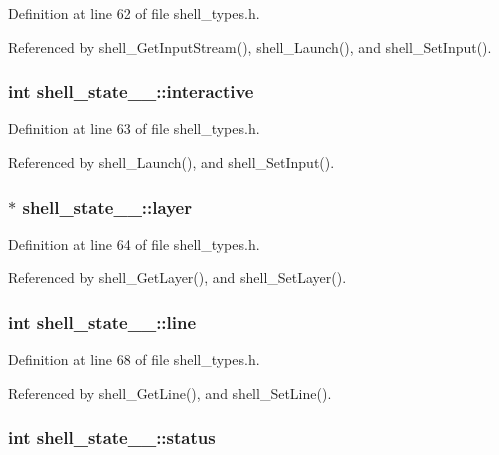 Definition at line 62 of file shell\_\-types.h.

Referenced by shell\_\-Get\-Input\-Stream(), shell\_\-Launch(), and shell\_\-Set\-Input().
\subsubsection{\setlength{\rightskip}{0pt plus 5cm}int {\bf shell\_\-state\_\-\_\-::interactive}}\label{structshell__state_____o1}




Definition at line 63 of file shell\_\-types.h.

Referenced by shell\_\-Launch(), and shell\_\-Set\-Input().
\subsubsection{$\ast$ {\bf shell\_\-state\_\-\_\-::layer}}\label{structshell__state_____o2}




Definition at line 64 of file shell\_\-types.h.

Referenced by shell\_\-Get\-Layer(), and shell\_\-Set\-Layer().
\subsubsection{\setlength{\rightskip}{0pt plus 5cm}int {\bf shell\_\-state\_\-\_\-::line}}\label{structshell__state_____o6}




Definition at line 68 of file shell\_\-types.h.

Referenced by shell\_\-Get\-Line(), and shell\_\-Set\-Line().
\subsubsection{\setlength{\rightskip}{0pt plus 5cm}int {\bf shell\_\-state\_\-\_\-::status}}\label{structshell__state_____o3}




